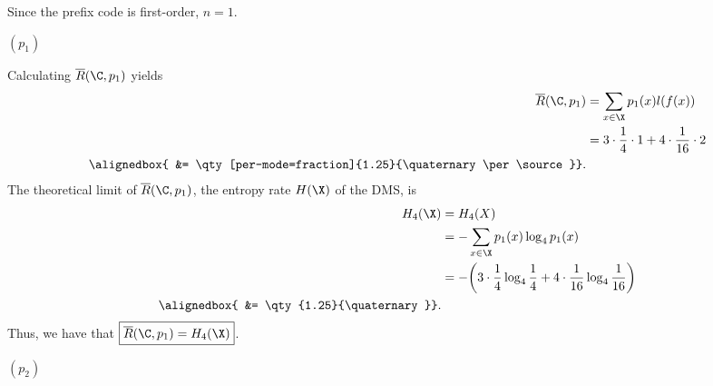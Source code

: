 \documentclass[
  coursecode={MTHE 474},
  assignmentname={Homework \homeworknumber},
  studentnumber=20053722,
  name={Bryan Hoang},
  draft,
]{
  ltxanswer%
}
\begin{document}
  \begin{questions}
    \setcounter{question}{\questionnumber}
    \addtocounter{question}{-1}
    \question[10]\
    \begin{parts}
      \part{}
      \begin{solution}
        Since the prefix code is first-order, \(n=1\).
        \begin{proofpart}
          \((p_{1})\)

          Calculating \(\overline{R}(\C,p_{1})\) yields
          \begin{align*}
            \overline{R}(\C,p_{1}) &= \sum_{x\in\X} p_{1}(x)l(f(x))                              \\
                                   &= 3 \cdot \frac{1}{4} \cdot 1 + 4 \cdot \frac{1}{16} \cdot 2 \\
            \alignedbox{           &= \qty[per-mode=fraction]{1.25}{\quaternary\per\source}}.
          \end{align*}
          The theoretical limit of \(\overline{R}(\C,p_{1})\), the entropy rate \(H(\X)\) of the DMS, is
          \begin{align*}
            H_{4}(\X)    &= H_{4}(X)                                                                                     \\
                         &= -\sum_{x\in\X} p_{1}(x)\log_{4}p_{1}(x)                                                      \\
                         &= -\biggl(3\cdot\frac{1}{4}\log_{4}\frac{1}{4} + 4\cdot\frac{1}{16}\log_{4}\frac{1}{16}\biggr) \\
            \alignedbox{ &= \qty{1.25}{\quaternary}}.
          \end{align*}
          Thus, we have that \(\boxed{\overline{R}(\C,p_{1})=H_{4}(\X)}\).
        \end{proofpart}

        \begin{proofpart}
          \((p_{2})\)


\end{proofpart}
\end{solution}
\end{parts}
\end{questions}
\end{document}
